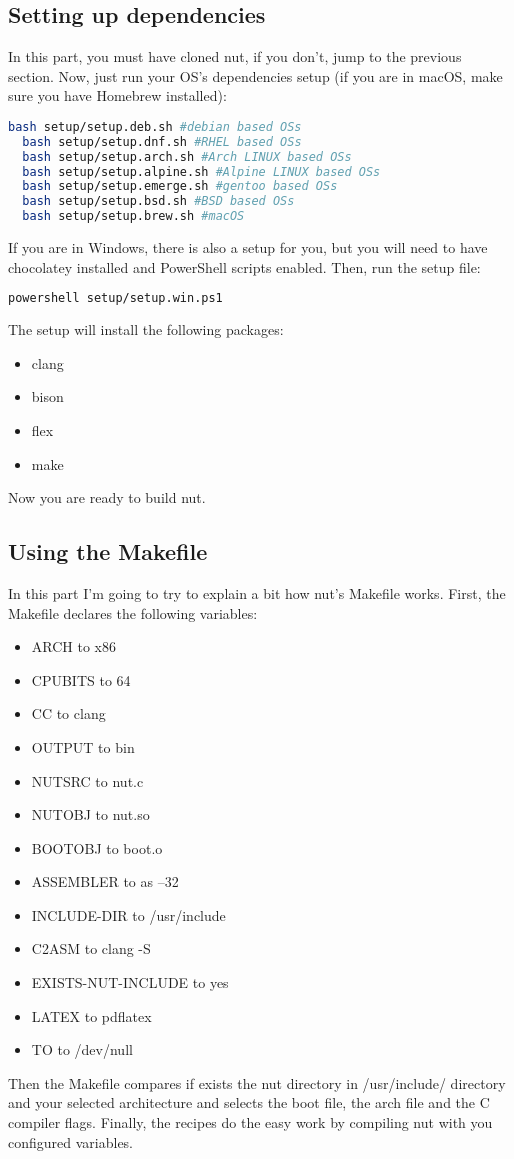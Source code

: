 \documentclass{article}
\begin{document}
  \subsection{Setting up dependencies}
  In this part, you must have cloned nut, if you don't, jump to the previous section. Now, just run your OS's dependencies setup (if you are in macOS, make sure you have Homebrew installed):
  \begin{lstlisting}[language=bash]
  bash setup/setup.deb.sh #debian based OSs
  bash setup/setup.dnf.sh #RHEL based OSs
  bash setup/setup.arch.sh #Arch LINUX based OSs
  bash setup/setup.alpine.sh #Alpine LINUX based OSs
  bash setup/setup.emerge.sh #gentoo based OSs
  bash setup/setup.bsd.sh #BSD based OSs
  bash setup/setup.brew.sh #macOS\end{lstlisting}
  If you are in Windows, there is also a setup for you, but you will need to have chocolatey installed and PowerShell scripts enabled. Then, run the setup file:
  \begin{lstlisting}[language=bash]
  powershell setup/setup.win.ps1\end{lstlisting}
  The setup will install the following packages:
  \begin{itemize}
  	\item clang
  	\item bison
  	\item flex
  	\item make
  \end{itemize}
  Now you are ready to build nut.
  \\
  \subsection{Using the Makefile}
  In this part I'm going to try to explain a bit how nut's Makefile works. First, the Makefile declares the following variables:
  \begin{itemize}
  	\item ARCH to x86
  	\item CPUBITS to 64
  	\item CC to clang
  	\item OUTPUT to bin
  	\item NUTSRC to nut.c
  	\item NUTOBJ to nut.so
  	\item BOOTOBJ to boot.o
  	\item ASSEMBLER to as --32
  	\item INCLUDE-DIR to /usr/include
  	\item C2ASM to clang -S
  	\item EXISTS-NUT-INCLUDE to yes
  	\item LATEX to pdflatex
  	\item TO to /dev/null
  \end{itemize}
  Then the Makefile compares if exists the nut directory in /usr/include/ directory and your selected architecture and selects the boot file, the arch file and the C compiler flags. Finally, the recipes do the easy work by compiling nut with you configured variables.
  \\
\end{document}
